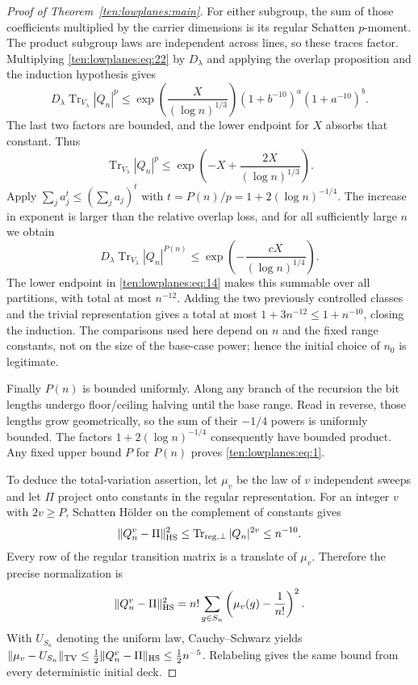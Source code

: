 \begin{proof}[Proof of Theorem~\ref{ten:lowplanes:main}]
For either subgroup, the sum of those coefficients multiplied by the carrier dimensions is its regular Schatten $p$-moment. The product subgroup laws are independent across lines, so these traces factor. Multiplying \eqref{ten:lowplanes:eq:22} by $D_\lambda$ and applying the overlap proposition and the induction hypothesis gives
\[
 D_\lambda\operatorname{Tr}_{V_\lambda}|Q_n|^p
 \le\exp\!\left(\frac{X}{(\log n)^{1/3}}\right)
       (1+b^{-10})^a(1+a^{-10})^b.
\]
The last two factors are bounded, and the lower endpoint for $X$ absorbs that constant. Thus
\[
 \operatorname{Tr}_{V_\lambda}|Q_n|^p
 \le\exp\!\left(-X+\frac{2X}{(\log n)^{1/3}}\right).
\]
Apply $\sum_j a_j^t\le(\sum_j a_j)^t$ with
$t=P(n)/p=1+2(\log n)^{-1/4}$. The increase in exponent is larger than the relative overlap loss, and for all sufficiently large $n$ we obtain
\[
 D_\lambda\operatorname{Tr}_{V_\lambda}|Q_n|^{P(n)}
 \le\exp\!\left(-\frac{cX}{(\log n)^{1/4}}\right).
\]
The lower endpoint in \eqref{ten:lowplanes:eq:14} makes this summable over all partitions, with total at most $n^{-12}$. Adding the two previously controlled classes and the trivial representation gives a total at most $1+3n^{-12}\le1+n^{-10}$, closing the induction. The comparisons used here depend on $n$ and the fixed range constants, not on the size of the base-case power; hence the initial choice of $n_0$ is legitimate.

Finally $P(n)$ is bounded uniformly. Along any branch of the recursion the bit lengths undergo floor/ceiling halving until the base range. Read in reverse, those lengths grow geometrically, so the sum of their $-1/4$ powers is uniformly bounded. The factors $1+2(\log n)^{-1/4}$ consequently have bounded product. Any fixed upper bound $P$ for $P(n)$ proves \eqref{ten:lowplanes:eq:1}.

To deduce the total-variation assertion, let $\mu_v$ be the law of $v$ independent sweeps and let $\Pi$ project onto constants in the regular representation. For an integer $v$ with $2v\ge P$, Schatten H\"older on the complement of constants gives
\[
 \|Q_n^v-\Pi\|_{\rm HS}^2
 \le\operatorname{Tr}_{\rm reg,\perp}|Q_n|^{2v}\le n^{-10}.
\]
Every row of the regular transition matrix is a translate of $\mu_v$. Therefore the precise normalization is
\[
 \|Q_n^v-\Pi\|_{\rm HS}^2
 =n!\sum_{g\in S_n}\left(\mu_v(g)-\frac1{n!}\right)^2.
\]
With $U_{S_n}$ denoting the uniform law, Cauchy--Schwarz yields
$\|\mu_v-U_{S_n}\|_{\rm TV}\le\tfrac12\|Q_n^v-\Pi\|_{\rm HS}\le\tfrac12n^{-5}$.
Relabeling gives the same bound from every deterministic initial deck.
\end{proof}

